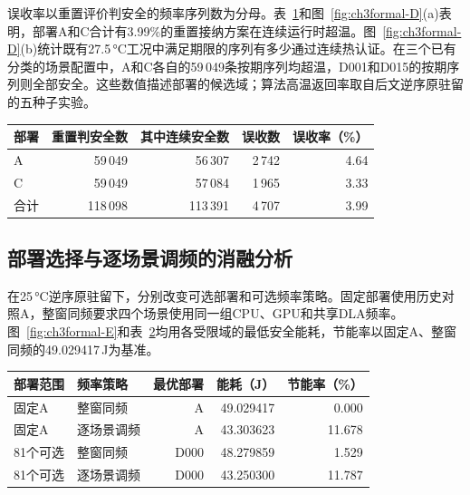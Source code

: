 误收率以重置评价判安全的频率序列数为分母。表~\ref{tab:ch3formal-reset}和图~\ref{fig:ch3formal-D}(a)表明，部署A和C合计有3.99\%的重置接纳方案在连续运行时超温。图~\ref{fig:ch3formal-D}(b)统计既有27.5\,°C工况中满足期限的序列有多少通过连续热认证。在三个已有分类的场景配置中，A和C各自的59\,049条按期序列均超温，D001和D015的按期序列则全部安全。这些数值描述部署的候选域；算法高温返回率取自后文逆序原驻留的五种子实验。
\begin{table}\centering
{}
\label{tab:ch3formal-reset}
\small
\begin{tabular}{lrrrr}\toprule
部署 & 重置判安全数 & 其中连续安全数 & 误收数 & 误收率（\%）\\\midrule
A & 59\,049 & 56\,307 & 2\,742 & 4.64\\
C & 59\,049 & 57\,084 & 1\,965 & 3.33\\
合计 & 118\,098 & 113\,391 & 4\,707 & 3.99\\\bottomrule
\end{tabular}
\end{table}

\ChThreeGroupBreak
\subsection{部署选择与逐场景调频的消融分析}
在25\,°C逆序原驻留下，分别改变可选部署和可选频率策略。固定部署使用历史对照A，整窗同频要求四个场景使用同一组CPU、GPU和共享DLA频率。图~\ref{fig:ch3formal-E}和表~\ref{tab:ch3formal-ablation}均用各受限域的最低安全能耗，节能率以固定A、整窗同频的49.029417\,J为基准。
\begin{table}\centering
{}
\label{tab:ch3formal-ablation}
\small
\begin{tabular}{llrrr}\toprule
部署范围 & 频率策略 & 最优部署 & 能耗（J） & 节能率（\%）\\\midrule
固定A & 整窗同频 & A & 49.029417 & 0.000\\
固定A & 逐场景调频 & A & 43.303623 & 11.678\\
81个可选 & 整窗同频 & D000 & 48.279859 & 1.529\\
81个可选 & 逐场景调频 & D000 & 43.250300 & 11.787\\\bottomrule
\end{tabular}
\end{table}

